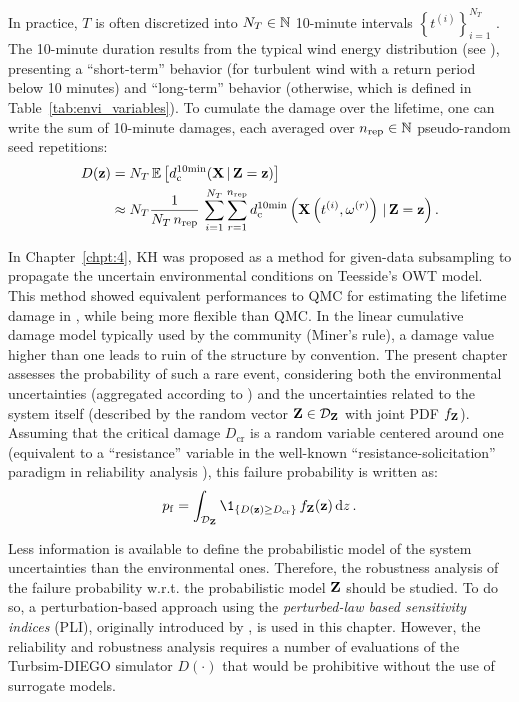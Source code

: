 In practice, $T$ is often discretized into $N_T \in \mathbb{N}$ 10-minute intervals $\left\{t^{(i)}\right\}_{i=1}^{N_T}$ \citep[Appendix H]{iec_2019}. 
The 10-minute duration results from the typical wind energy distribution (see ), presenting a ``short-term'' behavior (for turbulent wind with a return period below 10 minutes) and ``long-term'' behavior (otherwise, which is defined in Table~\ref{tab:envi_variables}).
To cumulate the damage over the lifetime, one can write the sum of 10-minute damages, each averaged over $n_{\mathrm{rep}} \in \mathbb{N}$ pseudo-random seed repetitions: 
\begin{subequations}
    \begin{align}
        D({\bf z}) &= N_T \, \mathbb{E}\left[d_{\mathrm{c}}^{10\mathrm{min}}({\bf X}\,|\,{\bf Z}={\bf z})\right]\\
             & \approx N_T \frac{1}{N_T \, n_{\mathrm{rep}}} \, \sum_{i=1}^{N_T} \sum_{r=1}^{n_{\mathrm{rep}}} d_{\mathrm{c}}^{10\mathrm{min}}\left({\bf X}\left(t^{(i)}, \omega^{(r)}\right)\,|\,{\bf Z}={\bf z}\right).
             \label{eq:expected_damage}
    \end{align}
\end{subequations}

In Chapter~\ref{chpt:4}, KH was proposed as a method for given-data subsampling to propagate the uncertain environmental conditions on Teesside's OWT model. 
This method showed equivalent performances to QMC for estimating the lifetime damage in , while being more flexible than QMC. 
In the linear cumulative damage model typically used by the community (Miner's rule), a damage value higher than one leads to ruin of the structure by convention. 
The present chapter assesses the probability of such a rare event, considering both the environmental uncertainties (aggregated according to ) and the uncertainties related to the system itself (described by the random vector ${\bf Z} \in \mathcal{D}_{\bf Z}$ with joint PDF $f_{\bf Z}$). 
Assuming that the critical damage $D_{\mathrm{cr}}$ is a random variable centered around one (equivalent to a ``resistance'' variable in the well-known ``resistance-solicitation'' paradigm in reliability analysis \citealp{lemaire_2009}), this failure probability is written as:
\begin{equation}
    \pf = \int_{\iD_\bZ} \1_{\{D(\bz) \geq D_{\mathrm{cr}}\}} \, f_\bZ(\bz) \, \dd z \,.
    \label{eq:owt_pf}
\end{equation}

Less information is available to define the probabilistic model of the system uncertainties than the environmental ones. 
Therefore, the robustness analysis of the failure probability w.r.t. the probabilistic model ${\bf Z}$ should be studied. 
To do so, a perturbation-based approach using the \textit{perturbed-law based sensitivity indices} (PLI), originally introduced by \citep{lemaitre_2015_PLI}, is used in this chapter.   
However, the reliability and robustness analysis requires a number of evaluations of the Turbsim-DIEGO simulator $D(\cdot)$ that would be prohibitive without the use of surrogate models. 

